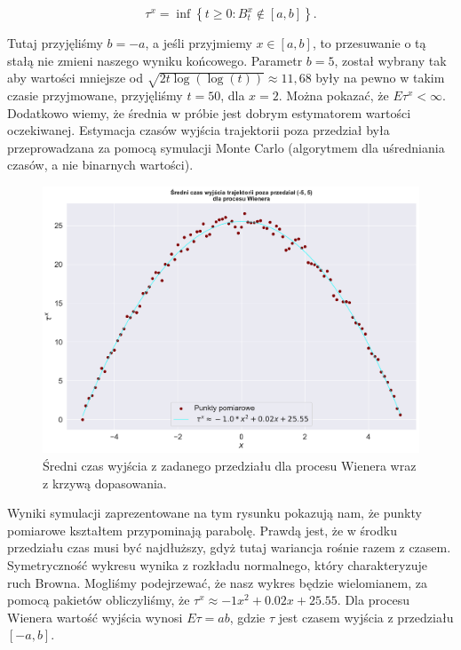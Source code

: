 \documentclass[12pt]{mwart}
\begin{document}
		$$\tau^x=\inf\left\{t\geqslant0:B^x_t\notin[a, b]\right\}.$$
	
\noindent Tutaj przyjęliśmy $b = -a$, a jeśli przyjmiemy $x \in [a,b]$, to przesuwanie o tą stałą nie zmieni naszego wyniku końcowego. Parametr $b = 5$, został wybrany tak aby wartości mniejsze od $\sqrt{2t\log(\log(t))} \approx 11,68$ były na pewno w takim czasie przyjmowane, przyjęliśmy $t=50$, dla $x=2$. 
Można pokazać, że $E\tau^x < \infty$. Dodatkowo wiemy, że średnia w próbie jest dobrym estymatorem wartości oczekiwanej.
Estymacja czasów wyjścia trajektorii poza przedział była przeprowadzana za pomocą symulacji Monte Carlo (algorytmem dla uśredniania czasów, a nie binarnych wartości).

	\begin{figure}[H]
		\begin{center}
			
			\includegraphics[scale=0.4]{1.pdf}
			\caption{Średni czas wyjścia z zadanego przedziału dla procesu Wienera \newline wraz z krzywą dopasowania.}
		\end{center}
	\end{figure}
	\noindent Wyniki symulacji zaprezentowane na tym rysunku pokazują nam, że punkty pomiarowe kształtem przypominają parabolę. Prawdą jest, że w środku przedziału czas musi być najdłuższy, gdyż tutaj wariancja rośnie razem z czasem. Symetryczność wykresu wynika z rozkładu normalnego, który charakteryzuje ruch Browna.
	Mogliśmy podejrzewać, że nasz wykres będzie wielomianem, za pomocą pakietów obliczyliśmy, że $\tau^x \approx -1x^2+0.02x+25.55$. Dla procesu Wienera wartość wyjścia wynosi $E\tau = ab$, gdzie $\tau$ jest czasem wyjścia z przedziału $[-a,b]$. 
	
\end{document}
